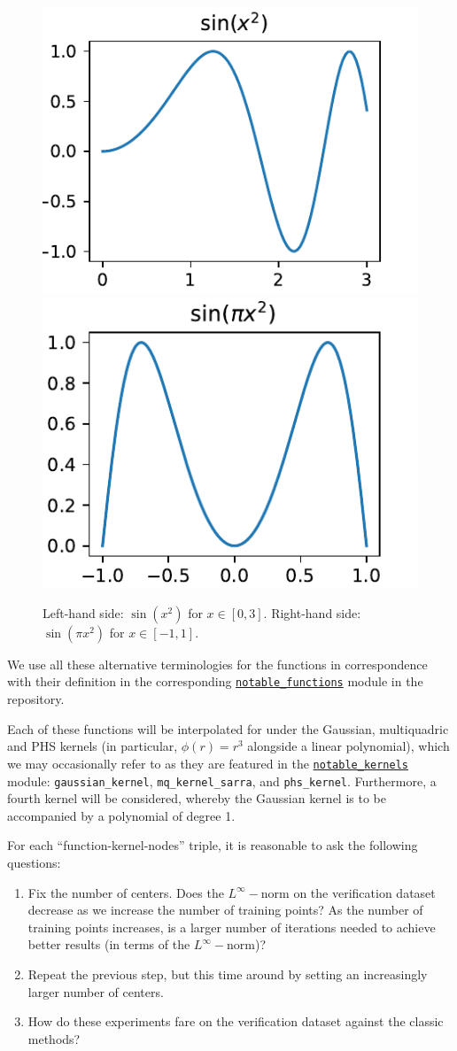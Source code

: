 \documentclass[12pt]{report} %
\begin{document}
\begin{figure}[ht]
    \centering
    \includegraphics[width=.4\textwidth]{imagenes/experiments/1d/intro/sin_higher_oscillations.pdf}
    \includegraphics[width=.4\textwidth]{imagenes/experiments/1d/intro/sin_pi_x_sq.pdf}
    \caption{Left-hand side: $\sin (x^2)$ for $x \in [0,
3]$. Right-hand side: $ \sin (\pi x^2)$ for $x \in [- 1, 1]$.}
    \label{fig:intro-control-functions}
\end{figure}

We use all these alternative terminologies for the functions in correspondence with their definition in the corresponding \href{https://github.com/heqro/tfm-experiments/blob/main/modules/notable_functions.py}{\texttt{notable\_functions}} module in the repository.

Each of these functions will be interpolated for under the Gaussian,
multiquadric and PHS kernels (in particular, $\phi(r)=r^3$ alongside a linear polynomial), which we may occasionally refer to as they are featured in the \href{https://github.com/heqro/tfm-experiments/blob/main/modules/notable_kernels.py}{\texttt{notable\_kernels}} module: \texttt{gaussian\_kernel}, \texttt{mq\_kernel\_sarra}, and \texttt{phs\_kernel}. Furthermore, a fourth kernel will be considered,
whereby the Gaussian kernel is to be accompanied by a polynomial of degree 1.


 For each
``function-kernel-nodes'' triple, it is reasonable to ask the following
questions:

\begin{enumerate}[i]
  \item Fix the number of centers. Does the $L^{\infty}-$norm on the
  verification dataset decrease as we increase the number of training points? 
  As the number of training points increases, is a larger number of iterations needed to achieve
  better results (in terms of the $L^{\infty}-$norm)?
  
  \item Repeat the previous step, but this time around by setting an increasingly larger
  number of centers.
  
  \item How do these experiments fare on the verification dataset against the
  classic methods?
\end{enumerate}
\end{document}
